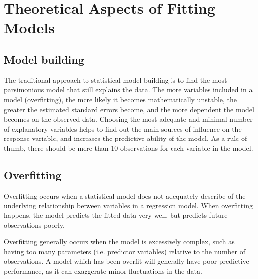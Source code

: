 \documentclass[a4paper,12pt]{article}
\begin{document}
\section{Theoretical Aspects of Fitting Models}



\subsection{Model building}

The traditional approach to statistical model building is to find the most parsimonious model that still explains the data. The more variables included in a model (overfitting), the more likely it becomes mathematically unstable, the greater the estimated standard errors become, and the more dependent the model becomes on the observed data. Choosing the most adequate and minimal number of explanatory variables helps to find out the main sources of influence on the response variable, and increases the predictive ability of the model. As a rule of thumb, there should be more than 10 observations for each variable in the model.
%


\subsection{Overfitting}

Overfitting occurs when a statistical model does not adequately describe of the underlying relationship between variables in a regression model. When overfitting happens, the model predicts the fitted data very well, but predicts future observations poorly.

Overfitting generally occurs when the model is excessively complex, such as having too many parameters (i.e. predictor variables) relative to the number of observations. A model which has been overfit will generally have poor predictive performance, as it can exaggerate minor fluctuations in the data.

\end{document}
